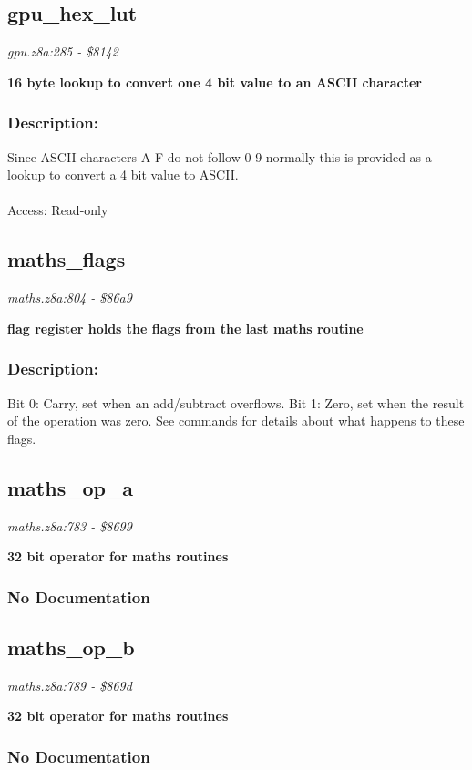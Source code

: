 \subsection{gpu\_hex\_lut}
\textit{gpu.z8a:285 - \$8142}

\noindent
\textbf{16 byte lookup to convert one 4 bit value to an ASCII character}

\subsubsection{Description:}
 Since ASCII characters A-F do not follow 0-9 normally this is provided as a lookup to convert a 4 bit value to ASCII.\\\\ Access: Read-only

\subsection{maths\_flags}
\textit{maths.z8a:804 - \$86a9}

\noindent
\textbf{flag register holds the flags from the last maths routine}

\subsubsection{Description:}
 Bit 0: Carry, set when an add/subtract overflows. Bit 1: Zero, set when the result of the operation was zero. See commands for details about what happens to these flags.

\subsection{maths\_op\_a}
\textit{maths.z8a:783 - \$8699}

\noindent
\textbf{32 bit operator for maths routines}

\subsubsection{No Documentation}


\subsection{maths\_op\_b}
\textit{maths.z8a:789 - \$869d}

\noindent
\textbf{32 bit operator for maths routines}

\subsubsection{No Documentation}



